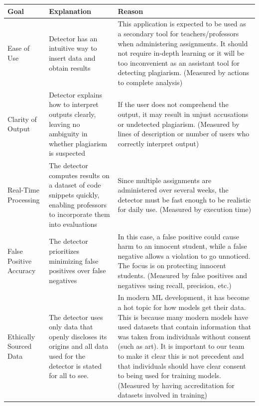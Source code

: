 \documentclass[12pt]{article}
\begin{document}
\begin{center}
    \begin{longtable}{ | p{3cm} | p{6cm} | p{6cm} | }
    \hline
    \textbf{Goal} & \textbf{Explanation} & \textbf{Reason} \\
    \hline
    Ease of Use & Detector has an intuitive way to insert data and obtain results &
    This application is expected to be used as a secondary tool for
    teachers/professors when administering assignments. It should not require
    in-depth learning or it will be too inconvenient as an assistant tool for
    detecting plagiarism. (Measured by actions to complete analysis)\\
    \hline
    Clarity of Output & Detector explains how to interpret outputs clearly, leaving
    no ambiguity in whether plagiarism is suspected & If the user does not
    comprehend the output, it may result in unjust accusations or undetected
    plagiarism. (Measured by lines of description or number of users who correctly
    interpret output)\\
    \hline
    Real-Time Processing & The detector computes results on a dataset of code
    snippets quickly, enabling professors to incorporate them into evaluations &
    Since multiple assignments are administered over several weeks, the detector
    must be fast enough to be realistic for daily use. (Measured by execution
    time)\\
    \hline
    False Positive Accuracy & The detector prioritizes minimizing false positives over
    false negatives & In this case, a false positive could cause harm to an innocent
    student, while a false negative allows a violation to go unnoticed. The focus is
    on protecting innocent students. (Measured by false positives and negatives
    using recall, precision, etc.)\\
    \hline
    Ethically Sourced Data & The detector uses only data that openly discloses its 
    origins and all data used for the detector is stated for all to see. & In 
    modern ML development, it has become a hot topic for how models get their data.
    This is because many modern models have used datasets that contain information
    that was taken from individuals without consent (such as art). It is
    important to our team to make it clear this is not precedent and that 
    individuals should have clear consent to being used for training models. 
    (Measured by having accreditation for datasets involved in training)\\
    \hline
    \end{longtable}
\end{center}
\end{document}
